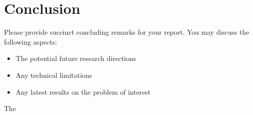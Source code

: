 \section{Conclusion}
\label{section:conclusion}
Please provide succinct concluding remarks for your report. You may discuss the following aspects:
\begin{itemize}
    \item The potential future research directions
    \item Any technical limitations
    \item Any latest results on the problem of interest
\end{itemize}

The 


